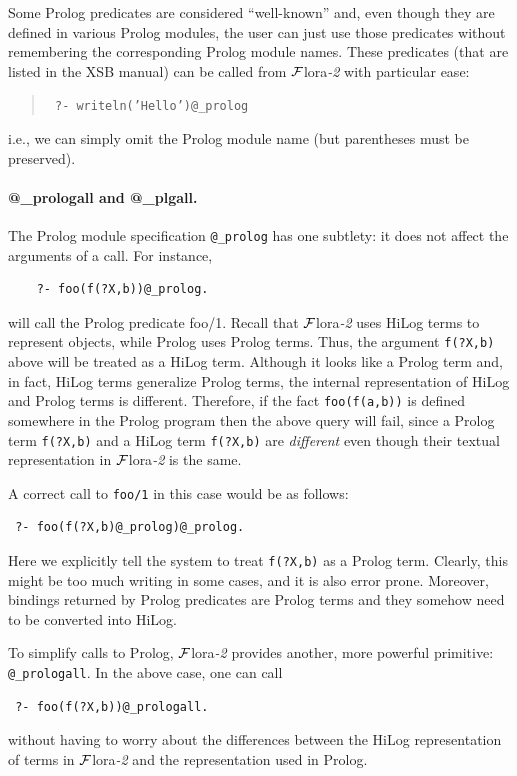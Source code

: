 \documentclass[11pt]{article}
\newcommand{\FLORA}{{\mbox{\sc ${\cal F}${lora}\rm\emph{-2}}}\xspace}
\begin{document}
Some Prolog predicates are considered ``well-known'' and, even though they
are defined in various Prolog modules, the user can just use those
predicates without remembering the corresponding Prolog module names. These
predicates (that are listed in the XSB manual) can be called from \FLORA
with particular ease:
\begin{quote}
 \tt
 ?- writeln('Hello')@\_prolog
\end{quote}
i.e., we can simply omit the Prolog module name (but parentheses must be
preserved). 

\paragraph{@\_prologall and @\_plgall.}
The Prolog module specification {\tt @\_prolog} has one subtlety: it does
not affect the arguments of a call. For instance, 
\begin{verbatim}
    ?- foo(f(?X,b))@_prolog.  
\end{verbatim}
will call the Prolog predicate foo/1. Recall that \FLORA uses HiLog terms
to represent objects, while Prolog uses Prolog terms.
Thus, the argument {\tt f(?X,b)} above will
be treated as a HiLog term. Although it looks like a Prolog term and, in
fact, HiLog terms generalize Prolog terms, the internal representation of
HiLog and Prolog terms is different.
Therefore, if the fact {\tt foo(f(a,b))} 
is defined somewhere in the Prolog program then the above query will fail,
since a Prolog term {\tt f(?X,b)} and a HiLog term {\tt f(?X,b)} are
\emph{different} even though their textual representation in \FLORA is the
same.

A correct call to {\tt foo/1} in this case would be as follows:
\begin{verbatim}
 ?- foo(f(?X,b)@_prolog)@_prolog.
\end{verbatim}
Here we explicitly tell the system to treat {\tt f(?X,b)} as a Prolog term. 
Clearly, this might be too much writing in some cases,
and it is also error prone. Moreover, bindings returned by Prolog
predicates are Prolog terms and they somehow need to be converted into
HiLog.

To simplify calls to Prolog, \FLORA provides another, more powerful
primitive: {\tt @\_prologall}. In the above case, one can call
\begin{verbatim}
 ?- foo(f(?X,b))@_prologall.  
\end{verbatim}
without having to worry about the differences between the HiLog
representation of terms in \FLORA and the representation used in Prolog.
\end{document}
